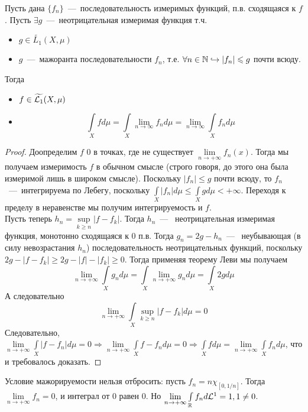 \begin{theorem}
    Пусть дана $\{f_n\}$~---~последовательность измеримых функций, п.в. сходящаяся к $f$. Пусть $\exists g$~---~неотрицательная измеримая функция т.ч. 
    \begin{itemize}
        \item $g \in \widetilde{L_1}(X, \mu)$
        \item $g$~---~мажоранта последовательности $f_n$, т.е. $\forall n \in \mathbb{N} \hookrightarrow |f_n| \leqslant g$ почти всюду.
    \end{itemize}
    Тогда 
    \begin{itemize}
        \item $f \in \widetilde{\mathcal{L}_1}(X, \mu)$
        \item \[
    \int\limits_X f d \mu = \int\limits_X \lim\limits_{n \to \infty} f_n d \mu = \lim\limits_{n \to \infty} \int\limits_X f_n d \mu
    \]
    \end{itemize}

\end{theorem}
\begin{proof}
    Доопределим $f$ 0 в точках, где не существует $\lim\limits_{n \rightarrow +\infty} f_n(x)$. Тогда мы получаем измеримость $f$ в обычном смысле (строго говоря, до этого она была измеримой лишь в широком смысле). Поскольку $|f_n| \leq g$ почти всюду, то $f_n$~---~интегрируема по Лебегу, поскольку $\int\limits_X |f_n|d\mu \leq \int\limits_X gd\mu < +\infty$. Переходя к пределу в неравенстве мы получим интегрируемость и $f$. \\ Пусть теперь $h_n = \sup\limits_{k \geq n} |f - f_k|$. Тогда $h_n$~---~ неотрицательная измеримая функция, монотонно сходящаяся к 0 п.в. Тогда $g_n = 2g - h_n$~---~ неубывающая (в силу невозрастания $h_n$) последовательность неотрицательных функций, поскольку $2g - |f - f_k| \geq 2g - |f| - |f_k| \geq 0$. Тогда применяя теорему Леви мы получаем \[\lim\limits_{n \rightarrow +\infty} \int\limits_X g_nd\mu = \int\limits_X \lim\limits_{n \rightarrow +\infty} g_nd\mu = \int\limits_X 2gd\mu\]
    А следовательно \[\lim\limits_{n \rightarrow +\infty} \int\limits_X \sup\limits_{k \geq n} |f - f_k|d\mu = 0\]
    Следовательно, $\lim\limits_{n \rightarrow +\infty} \int\limits_X |f - f_n|d\mu = 0 \Rightarrow \lim\limits_{n \rightarrow +\infty} \int\limits_X f - f_nd\mu = 0 \Rightarrow \int\limits_X fd\mu = \lim\limits_{n\rightarrow +\infty} \int\limits_X f_nd\mu$, что и требовалось доказать.
\end{proof}

\begin{note}
    Условие мажорируемости нельзя отбросить: пусть $f_n = n\chi_{[0, 1/n]}$. Тогда $\lim\limits_{n \rightarrow +\infty} f_n = 0$, и интеграл от 0 равен 0. Но $\lim\limits_{n \rightarrow +\infty} \int\limits_{\mathbb{R}} f_nd\mathcal{L}^1 = 1, 1 \neq 0$.
\end{note}
